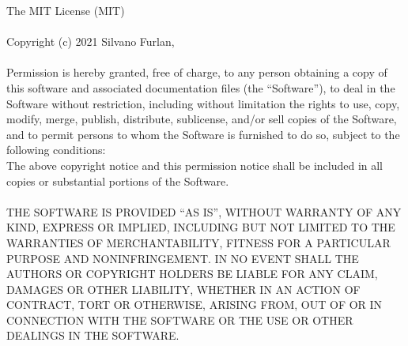 \documentclass[letterpaper,10pt,english]{hitec}
\begin{document}
The MIT License (MIT)
\\
\\
Copyright (c) 2021 Silvano Furlan,
\\
\\
Permission is hereby granted, free of charge, to any person obtaining a copy
of this software and associated documentation files (the “Software”), to deal
in the Software without restriction, including without limitation the rights
to use, copy, modify, merge, publish, distribute, sublicense, and/or sell
copies of the Software, and to permit persons to whom the Software is
furnished to do so, subject to the following conditions:
\\
The above copyright notice and this permission notice shall be included in
all copies or substantial portions of the Software.
\\
\\
THE SOFTWARE IS PROVIDED “AS IS”, WITHOUT WARRANTY OF ANY KIND, EXPRESS OR
IMPLIED, INCLUDING BUT NOT LIMITED TO THE WARRANTIES OF MERCHANTABILITY,
FITNESS FOR A PARTICULAR PURPOSE AND NONINFRINGEMENT. IN NO EVENT SHALL THE
AUTHORS OR COPYRIGHT HOLDERS BE LIABLE FOR ANY CLAIM, DAMAGES OR OTHER
LIABILITY, WHETHER IN AN ACTION OF CONTRACT, TORT OR OTHERWISE, ARISING FROM,
OUT OF OR IN CONNECTION WITH THE SOFTWARE OR THE USE OR OTHER DEALINGS IN
THE SOFTWARE.
\end{document}
